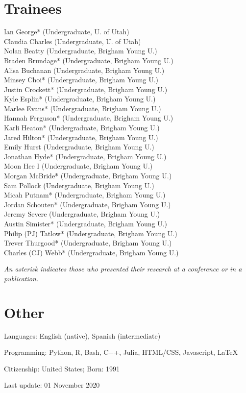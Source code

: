 \documentclass[margin,line]{res}
\begin{document}
\begin{resume}
\section{\sc Trainees}
Ian George* (Undergraduate, U. of Utah) \\
Claudia Charles (Undergraduate, U. of Utah) \\
Nolan Beatty (Undergraduate, Brigham Young U.) \\
Braden Brundage* (Undergraduate, Brigham Young U.) \\
Alisa Buchanan (Undergraduate, Brigham Young U.) \\
Minsey Choi* (Undergraduate, Brigham Young U.) \\
Justin Crockett* (Undergraduate, Brigham Young U.) \\
Kyle Esplin* (Undergraduate, Brigham Young U.) \\
Marlee Evans* (Undergraduate, Brigham Young U.) \\
Hannah Ferguson* (Undergraduate, Brigham Young U.) \\
Karli Heaton* (Undergraduate, Brigham Young U.) \\
Jared Hilton* (Undergraduate, Brigham Young U.) \\
Emily Hurst (Undergraduate, Brigham Young U.) \\
Jonathan Hyde* (Undergraduate, Brigham Young U.) \\
Moon Hee I (Undergraduate, Brigham Young U.) \\
Morgan McBride* (Undergraduate, Brigham Young U.) \\
Sam Pollock (Undergraduate, Brigham Young U.) \\
Micah Putnam* (Undergraduate, Brigham Young U.) \\
Jordan Schouten* (Undergraduate, Brigham Young U.) \\
Jeremy Severe (Undergraduate, Brigham Young U.) \\
Austin Simister* (Undergraduate, Brigham Young U.) \\
Philip (PJ) Tatlow* (Undergraduate, Brigham Young U.) \\
Trever Thurgood* (Undergraduate, Brigham Young U.) \\
Charles (CJ) Webb* (Undergraduate, Brigham Young U.)

\textit{\small{An asterisk indicates those who presented their research at a conference or in a publication.}}


\section{\sc Other}
Languages: English (native), Spanish (intermediate)

\vspace*{-2.5mm}
Programming:  Python, R, Bash, C++, Julia, HTML/CSS, Javascript, \LaTeX

\vspace*{-2.5mm}
Citizenship: United States; Born: 1991  \\

\begin{flushright}
Last update: 01 November 2020
\end{flushright}

\end{resume}
\end{document}
